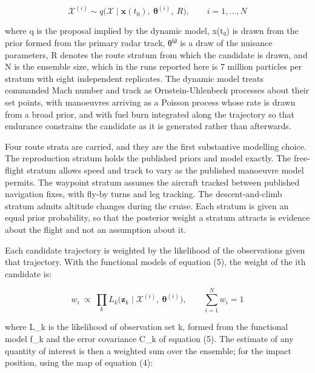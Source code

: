 \documentclass[12pt,a4paper]{article}
\makeatletter
\renewcommand\subsection{\@startsection{subsection}{2}{0pt}{8pt}{3pt}{\normalfont\normalsize\mdseries\itshape}}
\makeatother
\begin{document}
\begin{equation}

\mathcal{X}^{(i)} \sim q\bigl(\mathcal{X} \mid \mathbf{x}(t_0),\ \boldsymbol{\theta}^{(i)},\ R\bigr), \qquad i = 1,\dots,N

\end{equation}

where q is the proposal implied by the dynamic model, x(t₀) is drawn from the prior formed from the primary radar track, θ⁽ⁱ⁾ is a draw of the nuisance parameters, R denotes the route stratum from which the candidate is drawn, and N is the ensemble size, which in the runs reported here is 7 million particles per stratum with eight independent replicates. The dynamic model treats commanded Mach number and track as Ornstein-Uhlenbeck processes about their set points, with manoeuvres arriving as a Poisson process whose rate is drawn from a broad prior, and with fuel burn integrated along the trajectory so that endurance constrains the candidate as it is generated rather than afterwards.

Four route strata are carried, and they are the first substantive modelling choice. The reproduction stratum holds the published priors and model exactly. The free-flight stratum allows speed and track to vary as the published manoeuvre model permits. The waypoint stratum assumes the aircraft tracked between published navigation fixes, with fly-by turns and leg tracking. The descent-and-climb stratum admits altitude changes during the cruise. Each stratum is given an equal prior probability, so that the posterior weight a stratum attracts is evidence about the flight and not an assumption about it.

\subsection{2.5.  Weighting by the evidence}

Each candidate trajectory is weighted by the likelihood of the observations given that trajectory. With the functional models of equation (5), the weight of the ith candidate is:

\begin{equation}

w_i \ \propto\ \prod_{k} L_{k}\bigl(\mathbf{z}_{k} \mid \mathcal{X}^{(i)},\ \boldsymbol{\theta}^{(i)}\bigr),\qquad \sum_{i=1}^{N} w_i = 1

\end{equation}

where L_k is the likelihood of observation set k, formed from the functional model f_k and the error covariance C_k of equation (5). The estimate of any quantity of interest is then a weighted sum over the ensemble; for the impact position, using the map of equation (4):
\end{document}
